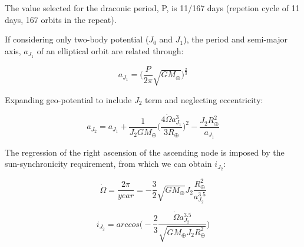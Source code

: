 \documentclass[conf]{new-aiaa}
\begin{document}
The value selected for the draconic period, P, is 11/167 days (repetion cycle of 11 days, 167 orbits in the repeat). 

If considering only two-body potential ($J_0$ and $J_1$), the period and semi-major axis, $a_{J_1}$ of an elliptical orbit are related through: 

\begin{equation}
	a_{J_1} = \Bigg( \frac{P}{2 \pi} \sqrt{ GM _{\oplus}  } \Bigg)^{\frac{2}{3}}
	\label{eq:a_J1}
\end{equation}

Expanding geo-potential to include $J_2$ term and neglecting eccentricity: 

\begin{equation}
	a_{J_2} = a_{J_1} + \frac{1}{J_2 GM _{\oplus}} \Bigg( \frac{4 \dot{\Omega} a^3_{J_1}}{ 3 R_{\oplus} } \Bigg)^2 - \frac{J_2 R_{\oplus}^2 }{ a_{J_1} }
\end{equation}

The regression of the right ascension of the ascending node is imposed by the sun-synchronicity requirement, from which we can obtain $i_{J_2}$: 

\begin{equation}
	\dot{\Omega} = \frac{2 \pi}{year} = - \frac{3}{2} \sqrt{GM_{\oplus}} J_2 \frac{R_{\oplus}^2}{a_{J_2}^{3.5}} 
\end{equation}

\begin{equation}
	i_{J_2} = arccos \Bigg( -\frac{2}{3} \frac{\dot{\Omega} a_{J_2}^{3.5} }{ \sqrt{ GM_{\oplus} J_2 R_{\oplus}^2 } } \Bigg)
\end{equation}




% 
\end{document}

